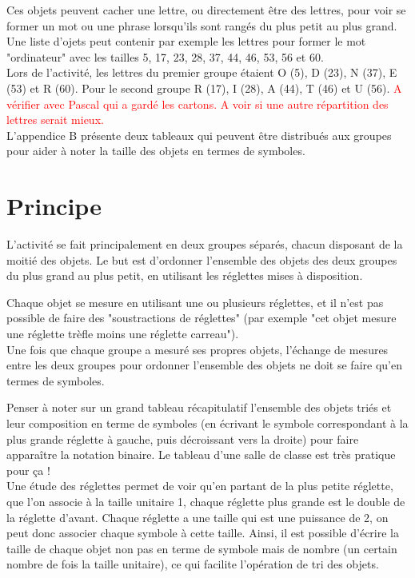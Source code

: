 \documentclass[a4paper,12pt]{scrartcl}
\begin{document}
Ces objets peuvent cacher une lettre, ou directement être des lettres, pour voir se former un mot ou une phrase lorsqu'ils sont rangés du plus petit au plus grand.
Une liste d'ojets peut contenir par exemple les lettres pour former le mot "ordinateur" avec les tailles 5, 17, 23, 28, 37, 44, 46, 53, 56 et 60.\\
Lors de l'activité, les lettres du premier groupe étaient O (5), D (23), N (37), E (53) et R (60). Pour le second groupe R (17), I (28), A (44), T (46) et U (56).
\textcolor{red}{A vérifier avec Pascal qui a gardé les cartons. A voir si une autre répartition des lettres serait mieux.}\\

L'appendice B présente deux tableaux qui peuvent être distribués aux groupes pour aider à noter la taille des objets en termes de symboles.



\section{Principe}

L'activité se fait principalement en deux groupes séparés, chacun disposant de la moitié des objets.
Le but est d'ordonner l'ensemble des objets des deux groupes du plus grand au plus petit, en utilisant les réglettes mises à disposition.

Chaque objet se mesure en utilisant une ou plusieurs réglettes, et il n'est pas possible de faire des "soustractions de réglettes" (par exemple "cet objet mesure une réglette trèfle moins une réglette carreau").\\


Une fois que chaque groupe a mesuré ses propres objets, l'échange de mesures entre les deux groupes pour ordonner l'ensemble des objets ne doit se faire qu'en termes de symboles.

Penser à noter sur un grand tableau récapitulatif l'ensemble des objets triés et leur composition en terme de symboles (en écrivant le symbole correspondant à la plus grande réglette à gauche, puis décroissant vers la droite) pour faire apparaître la notation binaire. Le tableau d'une salle de classe est très pratique pour ça !\\


Une étude des réglettes permet de voir qu'en partant de la plus petite réglette, que l'on associe à la taille unitaire 1, chaque réglette plus grande est le double de la réglette d'avant. 
%
Chaque réglette a une taille qui est une puissance de 2, on peut donc associer chaque symbole à cette taille. Ainsi, il est possible d'écrire la taille de chaque objet non pas en terme de symbole mais de nombre (un certain nombre de fois la taille unitaire), ce qui facilite l'opération de tri des objets.
\end{document}
